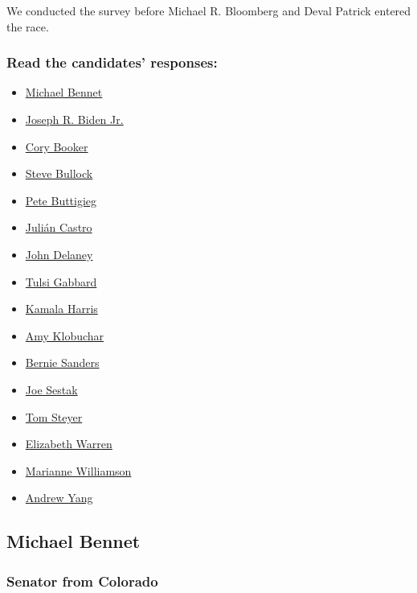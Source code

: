 We conducted the survey before Michael R. Bloomberg and Deval Patrick
entered the race.

\hypertarget{read-the-candidates-responses}{%
\subsubsection{Read the candidates'
responses:}\label{read-the-candidates-responses}}

\begin{itemize}
\tightlist
\item
  \protect\hyperlink{link-2207892c}{Michael Bennet}
\item
  \protect\hyperlink{link-af382cb}{Joseph R. Biden Jr.}
\item
  \protect\hyperlink{link-3a4f4fcc}{Cory Booker}
\item
  \protect\hyperlink{link-39eade44}{Steve Bullock}
\item
  \protect\hyperlink{link-1df6121c}{Pete Buttigieg}
\item
  \protect\hyperlink{link-37351ab8}{Julián Castro}
\item
  \protect\hyperlink{link-26ceb4d7}{John Delaney}
\item
  \protect\hyperlink{link-4555a1ac}{Tulsi Gabbard}
\item
  \protect\hyperlink{link-311aca4d}{Kamala Harris}
\item
  \protect\hyperlink{link-455dd6ab}{Amy Klobuchar}
\item
  \protect\hyperlink{link-766b867b}{Bernie Sanders}
\item
  \protect\hyperlink{link-4c858f0d}{Joe Sestak}
\item
  \protect\hyperlink{link-5b7961a0}{Tom Steyer}
\item
  \protect\hyperlink{link-6a161632}{Elizabeth Warren}
\item
  \protect\hyperlink{link-37425b6b}{Marianne Williamson}
\item
  \protect\hyperlink{link-74fd8511}{Andrew Yang}
\end{itemize}

\hypertarget{michael-bennet}{%
\subsection{Michael Bennet}\label{michael-bennet}}

\hypertarget{senator-from-colorado}{%
\subsubsection{Senator from Colorado}\label{senator-from-colorado}}

